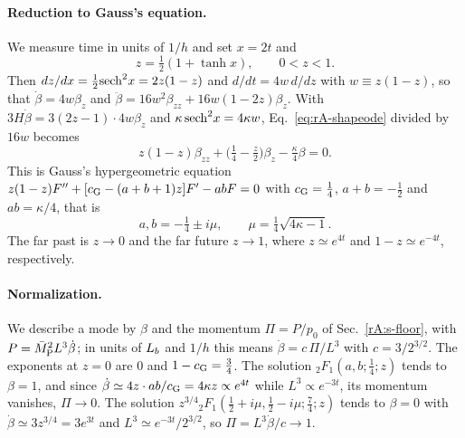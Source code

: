 \paragraph{Reduction to Gauss's equation.}
We measure time in units of $1/h$ and set $x=2t$ and
\begin{equation}
z=\tfrac12(1+\tanh x),\qquad 0<z<1 .
\end{equation}
Then $dz/dx=\tfrac12{\rm sech}^2x=2z(1-z)$ and $d/dt=4w\,d/dz$ with $w\equiv z(1-z)$, so that $\dot\beta=4w\beta_z$ and $\ddot\beta=16w^2\beta_{zz}+16w(1-2z)\beta_z$.
With $3H\dot\beta=3(2z-1)\cdot4w\beta_z$ and $\kappa\,{\rm sech}^2x=4\kappa w$, Eq.~\eqref{eq:rA-shapeode} divided by $16w$ becomes
\begin{equation}
z(1-z)\beta_{zz}+\big(\tfrac14-\tfrac z2\big)\beta_z-\tfrac\kappa4\beta=0 .
\label{eq:rA-gauss-eq}
\end{equation}
This is Gauss's hypergeometric equation $z(1-z)F''+[c_{\rm G}-(a+b+1)z]F'-abF=0$ with $c_{\rm G}=\tfrac14$, $a+b=-\tfrac12$ and $ab=\kappa/4$, that is
\begin{equation}
a,b=-\tfrac14\pm i\mu,\qquad \mu=\tfrac14\sqrt{4\kappa-1}.
\end{equation}
The far past is $z\to0$ and the far future $z\to1$, where $z\simeq e^{4t}$ and $1-z\simeq e^{-4t}$, respectively.

\paragraph{Normalization.}
We describe a mode by $\beta$ and the momentum $\Pi=P/p_0$ of Sec.~\ref{rA:s-floor}, with $P=\bar M_{\mathrm{P}}^2L^3\dot\beta$; in units of $L_b$ and $1/h$ this means $\dot\beta=c\,\Pi/L^3$ with $c=3/2^{3/2}$.
The exponents at $z=0$ are $0$ and $1-c_{\rm G}=\tfrac34$.
The solution ${}_2F_1(a,b;\tfrac14;z)$ tends to $\beta=1$, and since $\dot\beta\simeq4z\cdot ab/c_{\rm G}=4\kappa z\propto e^{4t}$ while $L^3\propto e^{-3t}$, its momentum vanishes, $\Pi\to0$.
The solution $z^{3/4}{}_2F_1(\tfrac12+i\mu,\tfrac12-i\mu;\tfrac74;z)$ tends to $\beta=0$ with $\dot\beta\simeq3z^{3/4}=3e^{3t}$ and $L^3\simeq e^{-3t}/2^{3/2}$, so $\Pi=L^3\dot\beta/c\to1$.

